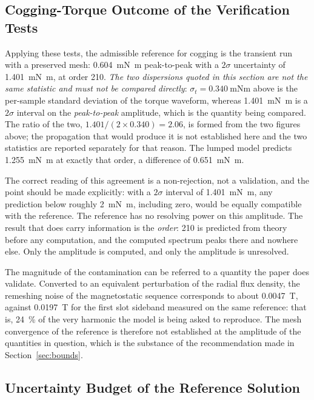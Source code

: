 \documentclass[10pt,a4paper,twocolumn]{article}
\theoremstyle{plain}
\theoremstyle{remark}
\begin{document}
\subsection{Cogging-Torque Outcome of the Verification Tests}

Applying these tests, the admissible reference for cogging is the
transient run with a preserved mesh: \SI{0.604}{\milli\newton\metre}
peak-to-peak with a $2\sigma$ uncertainty of
\SI{1.401}{\milli\newton\metre}, at order 210. \emph{The two dispersions
quoted in this section are not the same statistic and must not be
compared directly}: $\sigma_t=\SI{0.340}{\milli\newton\metre}$ above is
the per-sample standard deviation of the torque waveform, whereas
\SI{1.401}{\milli\newton\metre} is a $2\sigma$ interval on the
\emph{peak-to-peak} amplitude, which is the quantity being compared.
The ratio of the two,
$\num{1.401}/(2\times\num{0.340})=\num{2.06}$, is formed from the two
figures above; the propagation that would produce it is not established
here and the two statistics are reported separately for that reason.
The lumped model predicts
\SI{1.255}{\milli\newton\metre} at exactly that order, a difference of
\SI{0.651}{\milli\newton\metre}.

The correct reading of this agreement is a non-rejection, not a
validation, and the point should be made explicitly: with a $2\sigma$ interval of
\SI{1.401}{\milli\newton\metre}, any prediction below roughly
\SI{2}{\milli\newton\metre}, including zero, would be equally
compatible with the reference. The reference has no resolving power on
this amplitude. The result that does carry information is the
\emph{order}: 210 is predicted from theory before any computation, and
the computed spectrum peaks there and nowhere else. Only the amplitude
is computed, and only the amplitude is unresolved.

The magnitude of the contamination can be referred to a quantity the
paper does validate. Converted to an equivalent perturbation of the
radial flux density, the remeshing noise of the magnetostatic sequence
corresponds to about \SI{0.0047}{\tesla}, against
\SI{0.0197}{\tesla} for the first slot sideband measured on the same
reference: that is, \SI{24}{\percent} of the very harmonic the model is
being asked to reproduce. The mesh convergence of the reference is
therefore not established at the amplitude of the quantities in
question, which is the substance of the recommendation made in
Section~\ref{sec:bounds}.

\subsection{Uncertainty Budget of the Reference Solution}
\end{document}
